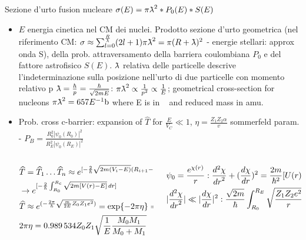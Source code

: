 \begin{frame}{Sezione d'urto fusion nucleare $\sigma(E)= \pi\lambdabar^2*P_0(E)*S(E)$}
    \begin{itemize}
        \item $E$ energia cinetica nel CM dei nuclei. Prodotto sezione d'urto geometrica (nel riferimento CM: $\sigma\approx\sum_{l=0}^{\frac{R}{\lambdabar}}(2l+1)\pi\lambdabar^2=\pi(R+\lambdabar)^2$ - energie stellari: approx onda S), della prob. attraversamento della barriera coulombiana $P_0$ e del fattore astrofisico $S(E)$. 
            $\lambdabar$ relativa delle particelle descrive l'indeterminazione sulla posizione nell'urto di due particelle con momento relativo p $\lambdabar=\frac{\hbar}{p}=\frac{\hbar}{\sqrt{2mE}}$: $\pi\lambdabar^2\propto \frac{1}{p^2}\propto \frac{1}{E}$; geometrical cross-section for \si{\kilo\ev} nucleons $\pi\lambdabar^2=657\invers{E}\si{\barn}$ where E is in \si{\kilo\ev} and reduced mass in amu.
        \item Prob. cross c-barrier: expansion of $\widehat{T}$ for $\frac{E}{V_C}\ll1$, $\eta=\frac{Z_1Z_2\alpha}{v}$ sommerfeld param. - $P_B=\frac{R_0^2|\psi_0(R_0)|^2}{R_E^2|\psi_0(R_E)|^2}$
            \begin{columns}[T]
                \begin{column}{0.45\textwidth}
                    \begin{align*}
                        &\widehat{T}=\widehat{T}_1\ldots\widehat{T}_n\approx e^{[-\frac{2}{\hbar}\sqrt{2m(V_i-E)}(R_{i+1}-R_i)]}\\
                        &\to e^{[-\frac{2}{\hbar}\int_{R_0}^{R_c}\sqrt{2m[V(r)-E]}\,dr]}\\
                        &\widehat{T}\approx e^{(-\frac{2\pi}{\hbar}\sqrt{\frac{m}{2E}Z_0Z_1e^2})}=\text{exp}\{-2\pi\eta\}=P_0(E)\\
                        &2\pi\eta=\num{0.989534}Z_0Z_1\sqrt{\frac{1}{E}\frac{M_0M_1}{M_0+M_1}}
                    \end{align*}
                \end{column}
                \begin{column}{0.55\textwidth}
                    \begin{align*}
                    &\psi_0=\frac{\exp{\chi(r)}}{r}: \TtwoDy{r}{\chi}+(\TDy{r}{\chi})^2=\frac{2m}{\hbar^2}[U(r)-E]\\
                    &|\TtwoDy{r}{\chi}|\ll|\TDy{r}{\chi}|^2: \frac{\sqrt{2m}}{\hbar}\int_{R_0}^{R_E}\sqrt{\frac{Z_1Z_2e^2}{r}-E}\,dr\\

\end{align*}
\end{column}
\end{columns}
\end{itemize}
\end{frame}
